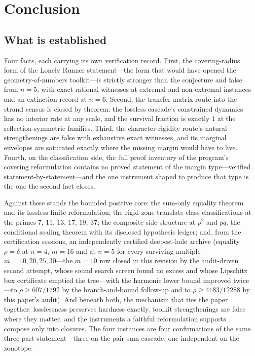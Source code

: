 
\section{Conclusion}\label{sec:concl}

\subsection{What is established}

Four facts, each carrying its own verification record. First, the
covering-radius form of the Lonely Runner statement---the form that
would have opened the geometry-of-numbers toolkit---is strictly stronger
than the conjecture and false from $n=5$, with exact rational witnesses
at extremal and non-extremal instances and an extinction record at
$n=6$. Second, the transfer-matrix route into the strand census is
closed by theorem: the lossless cascade's constrained dynamics has no
interior rate at any scale, and the survival fraction is exactly $1$ at
the reflection-symmetric families. Third, the character-rigidity route's
natural strengthenings are false with exhaustive exact witnesses, and
its marginal envelopes are saturated exactly where the missing margin
would have to live. Fourth, on the classification side, the full proof
inventory of the program's covering reformulation contains no proved
statement of the margin type---verified statement-by-statement---and the
one instrument shaped to produce that type is the one the second fact
closes.

Against these stands the bounded positive core: the sum-only equality
theorem and its lossless finite reformulation; the rigid-zone
translate-class classifications at the primes $7$, $11$, $13$, $17$,
$19$, $37$; the composite-side structure at $p^2$ and $pq$; the
conditional scaling theorem with its disclosed hypothesis ledger; and, from the certification sessions, an independently certified deepest-hole archive
(equality $\rho=\delta$ at $n=4$, $m=16$ and at $n=5$ for every
surviving multiple $m=10,20,25,30$---the $m=10$ row closed in this
revision by the audit-driven second attempt, whose sound search screen
found no excess and whose Lipschitz box certificate emptied the
tree---with the harmonic lower bound improved twice---to
$\rho\ge607/1792$ by the branch-and-bound follow-up and to
$\rho\ge4183/12288$ by this paper's audit). And
beneath both, the mechanism that ties the paper together: losslessness
preserves hardness exactly, toolkit strengthenings are false where they
matter, and the instruments a faithful reformulation supports compose
only into closures. The four instances are four confirmations of the
same three-part statement---three on the pair-sum cascade, one
independent on the zonotope.

